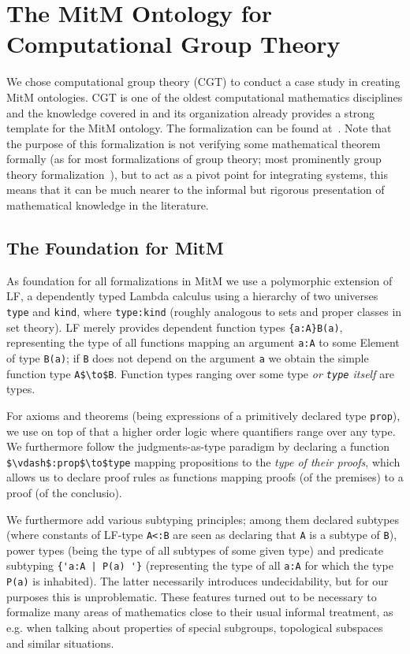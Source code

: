 \section{The MitM Ontology for Computational Group Theory}\label{sec:cgt}

We chose computational group theory (CGT) to conduct a case study in creating MitM ontologies. CGT is one of the oldest computational mathematics disciplines and the knowledge covered in \GAP and its organization already provides a strong template for the MitM ontology. The formalization can be found at~\cite{mitm:groups:on}. Note that the purpose of this formalization is not verifying some mathematical theorem formally (as for most formalizations of group theory; most prominently group theory formalization~\cite{Gonthier+:mcpoot13}), but to act as a pivot point for integrating systems, this means that it can be much nearer to the informal but rigorous presentation of mathematical knowledge in the literature.

\subsection{The Foundation for MitM}
As foundation for all formalizations in MitM we use a polymorphic extension of LF, a dependently typed Lambda calculus using a hierarchy
of two universes \lstinline|type| and \lstinline|kind|, where \lstinline|type:kind| (roughly analogous to sets and proper classes in set theory). LF merely provides dependent function types \lstinline|{a:A}B(a)|, representing the type of all functions mapping an argument \lstinline|a:A| to some Element of type \lstinline|B(a)|; if \lstinline|B| does not depend on the argument \lstinline|a| we obtain the simple function type \lstinline[mathescape]|A$\to$B|. Function types ranging over some type \emph{or \lstinline|type| itself} are types.

For axioms and theorems (being expressions of a primitively declared type \lstinline|prop|), we use on top of that a higher order logic where quantifiers range over any type. We furthermore follow the judgments-as-type paradigm by declaring a function \lstinline[mathescape]|$\vdash$:prop$\to$type| mapping propositions to the \emph{type of their proofs}, which allows us to declare proof rules as functions mapping proofs (of the premises) to a proof (of the conclusio).

We furthermore add various subtyping principles; among them declared subtypes (where constants of LF-type \lstinline|A<:B| are seen as declaring that \lstinline|A| is a subtype of \lstinline|B|), power types (being the type of all subtypes of some given type) and predicate subtyping \lstinline?{'a:A | P(a) '}? (representing the type of all \lstinline|a:A| for which the type \lstinline|P(a)| is inhabited). The latter necessarily introduces undecidability, but for our purposes this is unproblematic. These features turned out to be necessary to formalize many areas of mathematics close to their usual informal treatment, as e.g. when talking about properties of special subgroups, topological subspaces and similar situations.

